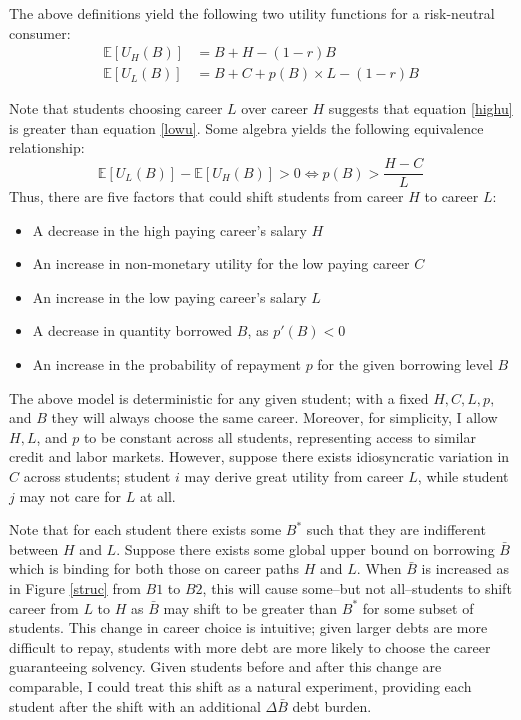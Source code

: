 \documentclass[12pt]{article}
\begin{document}
	The above definitions yield the following two utility functions for a risk-neutral consumer: 
	\begin{align}
	\mathbb{E}\left[U_H(B)\right] &= B + H - (1 - r)B \label{highu}\\
	\mathbb{E}\left[U_L(B)\right] &= B + C + p(B) \times L - (1 - r)B \label{lowu}
	\end{align}
	
	Note that students choosing career $L$ over career $H$ suggests that equation \ref{highu} is greater than equation \ref{lowu}. Some algebra yields the following equivalence relationship: 
	\begin{equation}
	\mathbb{E}\left[U_L(B)\right] - \mathbb{E}\left[U_H(B)\right] > 0 \iff p(B) > \frac{H - C}{L} \label{choicecon}
	\end{equation} 
	Thus, there are five factors that could shift students from career $H$ to career $L$:
	\begin{itemize}
		\singlespacing
		\item A decrease in the high paying career's salary $H$
		\item An increase in non-monetary utility for the low paying career $C$
		\item An increase in the low paying career's salary $L$
		\item A decrease in quantity borrowed $B$, as $p'(B) < 0$
		\item An increase in the probability of repayment $p$ for the given borrowing level $B$
	\end{itemize}

	The above model is deterministic for any given student; with a fixed $H, C, L, p,$ and $B$ they will always choose the same career. Moreover, for simplicity, I allow $H, L$, and $p$ to be constant across all students, representing access to similar credit and labor markets. However, suppose there exists idiosyncratic variation in $C$ across students; student $i$ may derive great utility from career $L$, while student $j$ may not care for $L$ at all.

	Note that for each student there exists some $B^*$ such that they are indifferent between $H$ and $L$. Suppose there exists some global upper bound on borrowing $\bar{B}$ which is binding for both those on career paths $H$ and $L$. When $\bar{B}$ is increased as in Figure \ref{struc} from $B1$ to $B2$, this will cause some--but not all--students to shift career from $L$ to $H$ as $\bar{B}$ may shift to be greater than $B^*$ for some subset of students. This change in career choice is intuitive; given larger debts are more difficult to repay, students with more debt are more likely to choose the career guaranteeing solvency. Given students before and after this change are comparable, I could treat this shift as a natural experiment, providing each student after the shift with an additional $\Delta\bar{B}$ debt burden. 
	
\end{document}
